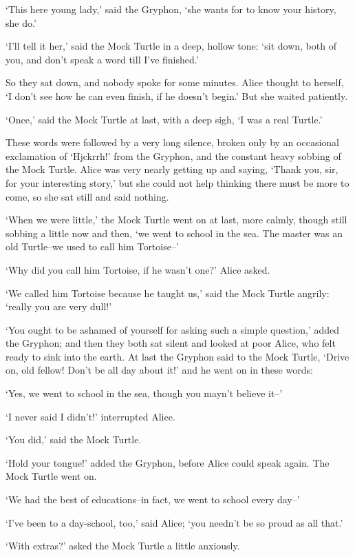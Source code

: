 \documentclass[statementpaper,twoside,openany]{memoir}
\begin{document}
`This here young lady,' said the Gryphon, `she wants for to know your history, she do.'

`I'll tell it her,' said the Mock Turtle in a deep, hollow tone: `sit down, both of you, and don't speak a word till I've finished.'

So they sat down, and nobody spoke for some minutes. Alice thought to herself, `I don't see how he can even finish, if he doesn't begin.' But she waited patiently.

`Once,' said the Mock Turtle at last, with a deep sigh, `I was a real Turtle.'

These words were followed by a very long silence, broken only by an occasional exclamation of `Hjckrrh!' from the Gryphon, and the constant heavy sobbing of the Mock Turtle. Alice was very nearly getting up and saying, `Thank you, sir, for your interesting story,' but she could not help thinking there must be more to come, so she sat still and said nothing.

`When we were little,' the Mock Turtle went on at last, more calmly, though still sobbing a little now and then, `we went to school in the sea. The master was an old Turtle--we used to call him Tortoise--'

`Why did you call him Tortoise, if he wasn't one?' Alice asked.

`We called him Tortoise because he taught us,' said the Mock Turtle angrily: `really you are very dull!'

`You ought to be ashamed of yourself for asking such a simple question,' added the Gryphon; and then they both sat silent and looked at poor Alice, who felt ready to sink into the earth. At last the Gryphon said to the Mock Turtle, `Drive on, old fellow! Don't be all day about it!' and he went on in these words:

`Yes, we went to school in the sea, though you mayn't believe it--'

`I never said I didn't!' interrupted Alice.

`You did,' said the Mock Turtle.

`Hold your tongue!' added the Gryphon, before Alice could speak again. The Mock Turtle went on.

`We had the best of educations--in fact, we went to school every day--'

`I've been to a day-school, too,' said Alice; `you needn't be so proud as all that.'

`With extras?' asked the Mock Turtle a little anxiously.
\end{document}
